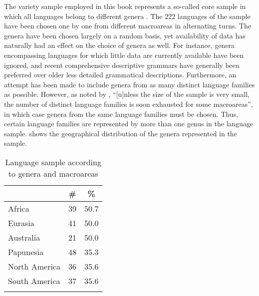The variety sample employed in this book represents a so-called core sample in which all languages belong to different genera \citep[250ff.]{miestamo:al:2016}. The 222 languages of the sample have been chosen one by one from different macroareas in alternating turns. The genera have been chosen largely on a random basis, yet availability of data has naturally had an effect on the choice of genera as well. For instance, genera encompassing languages for which little data are currently available have been ignored, and recent comprehensive descriptive grammars have generally been preferred over older less detailed grammatical descriptions. Furthermore, an attempt has been made to include genera from as many distinct language families as possible. However, as noted by \citet[257f.]{miestamo:al:2016}, “[u]nless the size of the sample is very small, the number of distinct language families is soon exhausted for some macroareas”, in which case genera from the same language families must be chosen. Thus, certain language families are represented by more than one genus in the language sample.  shows the geographical distribution of the genera represented in the sample. 

\begin{table}
	\begin{tabularx}{.4\textwidth}{lcc}
		\lsptoprule
		& \# & \% \\
		\midrule
		Africa & 39 & 50.7 \\
		Eurasia & 41 & 50.0 \\
		Australia & 21 & 50.0 \\
		Papunesia & 48 & 35.3 \\
		North America & 36 & 35.6 \\
		South America & 37 & 35.6 \\
		\lspbottomrule
	\end{tabularx}
	\caption{Language sample according to genera and macroareas}
	\label{tab:ch1:sample}
\end{table} 

\newpage

